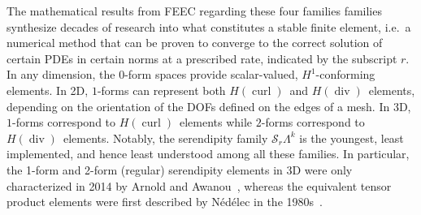 \documentclass[format=acmsmall,screen,timestamp=false,a4paper]{acmart}
\DeclareMathOperator{\Div}{div}
\DeclareMathOperator{\curl}{curl}
\newcommand{\calS}{\mathcal{S}}
\newcommand{\hcurl}{\ensuremath{{H}(\curl)}\xspace}
\newcommand{\hdiv}{\ensuremath{{H}(\Div)}\xspace}
\begin{document}
    The mathematical results from FEEC regarding these four families families synthesize decades of research into what constitutes a stable finite element, i.e.\ a numerical method that can be proven to converge to the correct solution of certain PDEs in certain norms at a prescribed rate, indicated by the subscript $r$.  In any dimension, the $0$-form spaces provide scalar-valued, $H^1$-conforming elements.  In 2D, $1$-forms can represent both \hcurl~and \hdiv~elements, depending on the orientation of the DOFs defined on the edges of a mesh.  In 3D, $1$-forms correspond to \hcurl~elements while $2$-forms correspond to \hdiv~elements.  Notably, the serendipity family $\calS_r\Lambda^k$ is the youngest, least implemented, and hence least understood among all these families.  In particular, the 1-form and 2-form (regular) serendipity elements in 3D were only characterized in 2014 by Arnold and Awanou~\cite{arnold2014finite}, whereas the equivalent tensor product elements were first described by N\'ed\'elec in the 1980s~\cite{N1980,N1986}.
 
\end{document}
